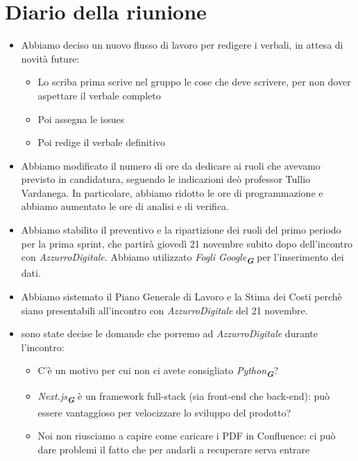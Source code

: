 
\section{Diario della riunione}

\begin{itemize}
    \item Abbiamo deciso un nuovo flusso di lavoro per redigere i verbali, in attesa di novità future:
    \begin{itemize}
        \item Lo scriba prima scrive nel gruppo le cose che deve scrivere, per non dover aspettare il verbale completo 
        \item Poi assegna le issues
        \item Poi redige il verbale definitivo
    \end{itemize}
    \item Abbiamo modificato il numero di ore da dedicare ai ruoli che avevamo previsto in candidatura, seguendo le indicazioni deò professor Tullio
    Vardanega. In particolare, abbiamo ridotto le ore di programmazione e abbiamo aumentato le ore di analisi e di verifica.
    \item Abbiamo stabilito il preventivo e la ripartizione dei ruoli del primo periodo per la prima sprint, che partirà giovedì 21 novembre subito 
    dopo dell'incontro con \emph{AzzurroDigitale}. Abbiamo utilizzato \emph{Fogli Google}\textsubscript{\textit{\textbf{G}}} per l'inserimento dei dati.
    \item Abbiamo sistemato il Piano Generale di Lavoro e la Stima dei Costi perchè siano presentabili all'incontro con \emph{AzzurroDigitale}
    del 21 novembre.
    \item sono state decise le domande che porremo ad \emph{AzzurroDigitale} durante l'incontro:
    \begin{itemize}
        \item C'è un motivo per cui non ci avete consigliato \emph{Python}\textsubscript{\textit{\textbf{G}}}?
        \item \emph{Next.js}\textsubscript{\textit{\textbf{G}}} è un framework full-stack (sia front-end che back-end): può essere vantaggioso per 
        velocizzare lo sviluppo del prodotto?
        \item Noi non riusciamo a capire come caricare i PDF in Confluence: ci può dare problemi il fatto che per andarli a recuperare serva entrare 

\end{itemize}
\end{itemize}
